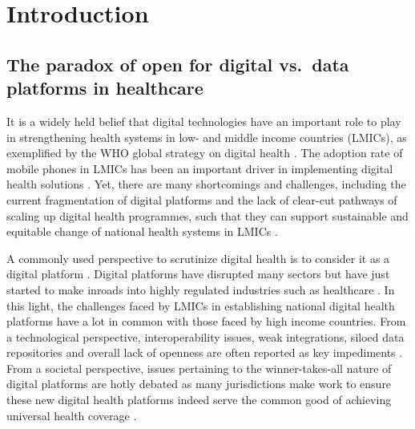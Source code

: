 \documentclass[
  authoryear]{elsarticle}
\begin{document}
\section{Introduction}\label{sec-intro}

\subsection{The paradox of open for digital vs.~data platforms in
healthcare}\label{the-paradox-of-open-for-digital-vs.-data-platforms-in-healthcare}

It is a widely held belief that digital technologies have an important
role to play in strengthening health systems in low- and middle income
countries (LMICs), as exemplified by the WHO global strategy on digital
health \citep{who2021global}. The adoption rate of mobile phones in
LMICs has been an important driver in implementing digital health
solutions \citep{mccool2022mobile}. Yet, there are many shortcomings and
challenges, including the current fragmentation of digital platforms and
the lack of clear-cut pathways of scaling up digital health programmes,
such that they can support sustainable and equitable change of national
health systems in LMICs
\citep{mccool2022mobile, who2019recommendations, neumark2021digital}.

A commonly used perspective to scrutinize digital health is to consider
it as a digital platform \citep{dereuver2018digital}. Digital platforms
have disrupted many sectors but have just started to make inroads into
highly regulated industries such as healthcare \citep{ozalp2022digital}.
In this light, the challenges faced by LMICs in establishing national
digital health platforms have a lot in common with those faced by high
income countries. From a technological perspective, interoperability
issues, weak integrations, siloed data repositories and overall lack of
openness are often reported as key impediments
\citep{malm-nicolais2023exploring, mehl2023fullstac}. From a societal
perspective, issues pertaining to the winner-takes-all nature of digital
platforms are hotly debated as many jurisdictions make work to ensure
these new digital health platforms indeed serve the common good of
achieving universal health coverage \citep{sharon2018when}.
\end{document}
